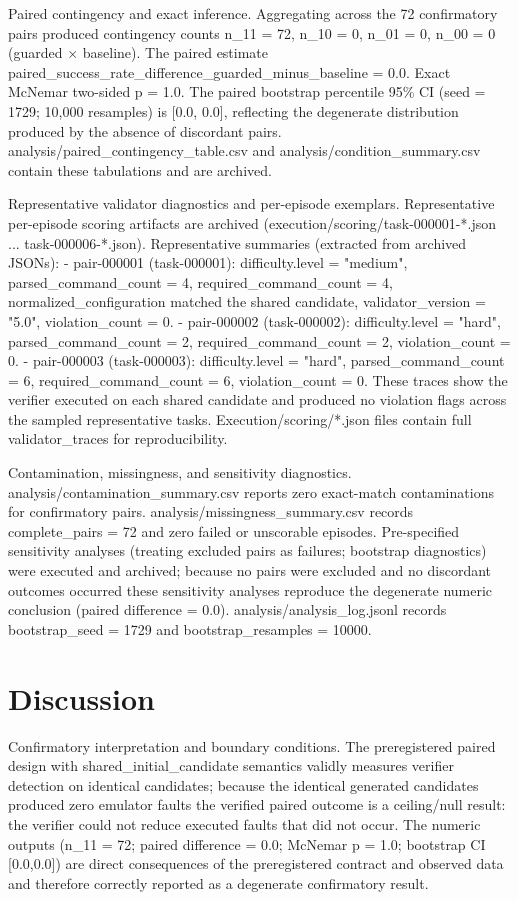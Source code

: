 \documentclass[conference]{IEEEtran}
\begin{document}
Paired contingency and exact inference. Aggregating across the 72 confirmatory pairs produced contingency counts n\_11 = 72, n\_10 = 0, n\_01 = 0, n\_00 = 0 (guarded \ensuremath{\times} baseline). The paired estimate paired\_success\_rate\_difference\_guarded\_minus\_baseline = 0.0. Exact McNemar two-sided p = 1.0. The paired bootstrap percentile 95\% CI (seed = 1729; 10,000 resamples) is [0.0, 0.0], reflecting the degenerate distribution produced by the absence of discordant pairs. analysis/paired\_contingency\_table.csv and analysis/condition\_summary.csv contain these tabulations and are archived.

Representative validator diagnostics and per-episode exemplars. Representative per-episode scoring artifacts are archived (execution/scoring/task-000001-*.json ... task-000006-*.json). Representative summaries (extracted from archived JSONs):
- pair-000001 (task-000001): difficulty.level = "medium", parsed\_command\_count = 4, required\_command\_count = 4, normalized\_configuration matched the shared candidate, validator\_version = "5.0", violation\_count = 0.
- pair-000002 (task-000002): difficulty.level = "hard", parsed\_command\_count = 2, required\_command\_count = 2, violation\_count = 0.
- pair-000003 (task-000003): difficulty.level = "hard", parsed\_command\_count = 6, required\_command\_count = 6, violation\_count = 0.
These traces show the verifier executed on each shared candidate and produced no violation flags across the sampled representative tasks. Execution/scoring/*.json files contain full validator\_traces for reproducibility.

Contamination, missingness, and sensitivity diagnostics. analysis/contamination\_summary.csv reports zero exact-match contaminations for confirmatory pairs. analysis/missingness\_summary.csv records complete\_pairs = 72 and zero failed or unscorable episodes. Pre-specified sensitivity analyses (treating excluded pairs as failures; bootstrap diagnostics) were executed and archived; because no pairs were excluded and no discordant outcomes occurred these sensitivity analyses reproduce the degenerate numeric conclusion (paired difference = 0.0). analysis/analysis\_log.jsonl records bootstrap\_seed = 1729 and bootstrap\_resamples = 10000.

\section{Discussion}
Confirmatory interpretation and boundary conditions. The preregistered paired design with shared\_initial\_candidate semantics validly measures verifier detection on identical candidates; because the identical generated candidates produced zero emulator faults the verified paired outcome is a ceiling/null result: the verifier could not reduce executed faults that did not occur. The numeric outputs (n\_11 = 72; paired difference = 0.0; McNemar p = 1.0; bootstrap CI [0.0,0.0]) are direct consequences of the preregistered contract and observed data and therefore correctly reported as a degenerate confirmatory result.
\end{document}
